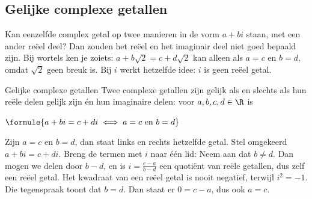 
\begin{oefeningen}
\end{oefeningen}

\subsection{Gelijke complexe getallen}

Kan eenzelfde complex getal op twee manieren in de vorm $a + bi$ staan, met een ander reëel deel? Dan zouden het reëel en het imaginair deel niet goed bepaald zijn. Bij wortels ken je zoiets: $a + b\sqrt2 = c + d\sqrt2$ kan alleen als $a = c$ en $b = d$, omdat $\sqrt2$ geen breuk is. Bij $i$ werkt hetzelfde idee: $i$ is geen reëel getal.

\begin{theorie}
\begin{stelling}{Gelijke complexe getallen}
Twee complexe getallen zijn gelijk als en slechts als hun reële delen gelijk zijn én hun imaginaire delen: voor $a, b, c, d \in \R$ is

\vspace{1mm}
\qquad $\formule{a + bi = c + di \iff a = c \text{ en } b = d}$
\end{stelling}

\begin{bewijs}
Zijn $a = c$ en $b = d$, dan staat links en rechts hetzelfde getal. Stel omgekeerd $a + bi = c + di$. Breng de termen met $i$ naar één lid:
Neem aan dat $b \neq d$. Dan mogen we delen door $b - d$, en is $i = \frac{c - a}{b - d}$ een quotiënt van reële getallen, dus zelf een reëel getal. Het kwadraat van een reëel getal is nooit negatief, terwijl $i^2 = -1$. Die tegenspraak toont dat $b = d$. Dan staat er $0 = c - a$, dus ook $a = c$.
\end{bewijs}
\end{theorie}

